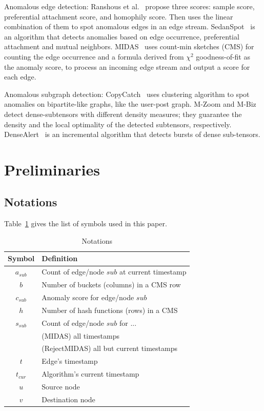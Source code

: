 \documentclass[5p]{elsarticle}
\begin{document}
	Anomalous edge detection: Ranshous et al.~\cite{ranshous2016a} propose three scores: sample score, preferential attachment score, and homophily score. Then uses the linear combination of them to spot anomalous edges in an edge stream. SedanSpot~\cite{eswaran2018sedanspot} is an algorithm that detects anomalies based on edge occurrence, preferential attachment and mutual neighbors. MIDAS~\cite{bhatia2020midas} uses count-min sketches (CMS) for counting the edge occurrence and a formula derived from $\chi^2$ goodness-of-fit as the anomaly score, to process an incoming edge stream and output a score for each edge.

	Anomalous subgraph detection: CopyCatch~\cite{beutel2013copycatch} uses clustering algorithm to spot anomalies on bipartite-like graphs, like the user-post graph. M-Zoom and M-Biz~\cite{shin2018fast} detect dense-subtensors with different density measures; they guarantee the density and the local optimality of the detected subtensors, respectively. DenseAlert~\cite{shin2017densealert} is an incremental algorithm that detects bursts of dense sub-tensors.


	\section{Preliminaries}

	\subsection{Notations}

	Table~\ref{tab:Notation} gives the list of symbols used in this paper.

	\begin{table}[h]
		\centering
		\caption{Notations}
		\label{tab:Notation}
		\begin{tabular}{cl}
			\hline
			Symbol & Definition \\
			\hline
			$a_{sub}$ & Count of edge/node $sub$ at current timestamp \\
			$b$ & Number of buckets (columns) in a CMS row \\
			$c_{sub}$ & Anomaly score for edge/node $sub$ \\
			$h$ & Number of hash functions (rows) in a CMS \\
			$s_{sub}$ & Count of edge/node $sub$ for ... \\
			& (MIDAS) all timestamps \\
			& (RejectMIDAS) all but current timestamps \\
			$t$ & Edge's timestamp \\
			$t_{cur}$ & Algorithm's current timestamp \\
			$u$ & Source node \\
			$v$ & Destination node \\
			\hline
		\end{tabular}
	\end{table}
\end{document}
